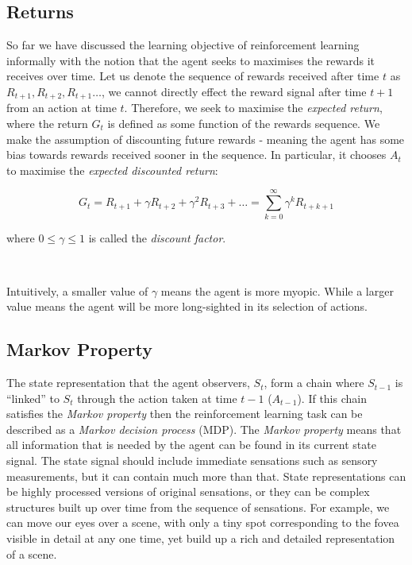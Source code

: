 \documentclass{article}
\begin{document}
\subsection{Returns}


So far we have discussed the learning objective of reinforcement learning informally with the notion that the agent seeks to maximises the rewards it receives over time. Let us denote the sequence of rewards received after time $t$ as $R_{t+1}, R_{t+2}, R_{t+1} \hdots$, we cannot directly effect the reward signal after time $t+1$ from an action at time $t$. Therefore, we seek to maximise the \textit{expected return}, where the return $G_t$ is defined as some function of the rewards sequence. We make the assumption of discounting future rewards - meaning the agent has some bias towards rewards received sooner in the sequence. In particular, it chooses $A_t$ to maximise the \textit{expected discounted return}:

\begin{equation}\label{eq:returns}
	G_t = R_{t+1} + \gamma R_{t+2}+ \gamma^2 R_{t+3} + \hdots = \sum_{k=0}^\infty \gamma^k R_{t + k + 1}
\end{equation}

where $0 \leq \gamma \leq 1$ is called the \textit{discount factor}.

\

Intuitively, a smaller value of $\gamma$ means the agent is more myopic. While a larger value means the agent will be more long-sighted in its selection of actions.

\subsection{Markov Property}

 The state representation that the agent observers, $S_t$, form a chain where $S_{t-1}$ is ``linked'' to $S_t$ through the action taken at time $t - 1$ ($A_{t-1}$). If this chain satisfies the \textit{Markov property} then the reinforcement learning task can be described as a \textit{Markov decision process} (MDP). The \textit{Markov property} means that all information that is needed by the agent can be found in its current state signal. The state signal should include immediate sensations such as sensory measurements, but it can contain much more than that. State representations can be highly processed versions of original sensations, or they can be complex structures built up over time from the sequence of sensations. For example, we can move our eyes over a scene, with only a tiny spot corresponding to the fovea visible in detail at any one time, yet build up a rich and detailed representation of a scene. \citep{sutton2018reinforcement}
 
\end{document}
